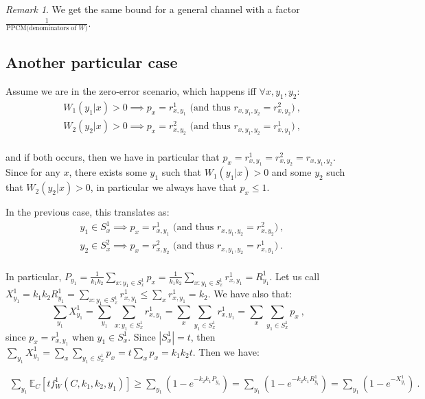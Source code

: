 \documentclass[11pt]{article}
\theoremstyle{definition}
\theoremstyle{remark}
\newtheorem*{rk}{Remark}
\begin{document}
\begin{rk}
  We get the same bound for a general channel with a factor $\frac{1}{\text{PPCM(denominators of $W$)}}$.
\end{rk}

\subsection{Another particular case}
Assume we are in the zero-error scenario, which happens iff $\forall x,y_1,y_2$:
\begin{equation}
  \begin{aligned}
    &W_1(y_1|x) > 0 \implies p_x = r^1_{x,y_1} \text{ (and thus $r_{x,y_1,y_2} = r^2_{x,y_2}$)} \ ,\\
    &W_2(y_2|x) > 0 \implies p_x = r^2_{x,y_2} \text{ (and thus $r_{x,y_1,y_2} = r^1_{x,y_1}$)} \ ,\\
  \end{aligned}
\end{equation}

and if both occurs, then we have in particular that $p_x = r^1_{x,y_1} = r^2_{x,y_2} = r_{x,y_1,y_2}$. Since for any $x$, there exists some $y_1$ such that $W_1(y_1|x) > 0$ and some $y_2$ such that $W_2(y_2|x) > 0$, in particular we always have that $p_x \leq 1$.

In the previous case, this translates as:
\begin{equation}
  \begin{aligned}
    &y_1 \in S^1_x \implies p_x = r^1_{x,y_1} \text{ (and thus $r_{x,y_1,y_2} = r^2_{x,y_2}$)} \ ,\\
    &y_2 \in S^2_x \implies p_x = r^2_{x,y_2} \text{ (and thus $r_{x,y_1,y_2} = r^1_{x,y_1}$)} \ .\\
  \end{aligned}
\end{equation}


In particular, $P_{y_1} = \frac{1}{k_1k_2}\sum_{x : y_1 \in S^1_x} p_x = \frac{1}{k_1k_2}\sum_{x : y_1 \in S^1_x} r^1_{x,y_1} = R^1_{y_1}$. Let us call $X^1_{y_1}=k_1k_2R^1_{y_1}=\sum_{x : y_1 \in S^1_x} r^1_{x,y_1}\leq\sum_x r^1_{x,y_1}=k_2$. We have also that:
\[\sum_{y_1}X^1_{y_1}=\sum_{y_1}\sum_{x : y_1 \in S^1_x} r^1_{x,y_1}=\sum_x\sum_{y_1 \in S^1_x} r^1_{x,y_1}=\sum_x\sum_{y_1 \in S^1_x} p_x \ ,\]
since $p_x = r^1_{x,y_1}$ when $y_1 \in S^1_x$. Since $|S^1_x|=t$, then $\sum_{y_1}X^1_{y_1}=\sum_x\sum_{y_1 \in S^1_x} p_x =t\sum_x p_x = k_1k_2t$. Then we have:

\begin{equation}
  \begin{aligned}
    \sum_{y_1}\mathbb{E}_C\left[tf_W^1(C,k_1,k_2,y_1)\right]  \geq \sum_{y_1}\left(1 - e^{-k_2k_1P_{y_1}}\right) =  \sum_{y_1}\left(1 - e^{-k_2k_1R^1_{y_1}}\right) = \sum_{y_1}\left(1 - e^{-X^1_{y_1}}\right) \ .
  \end{aligned}
\end{equation}
\end{document}
